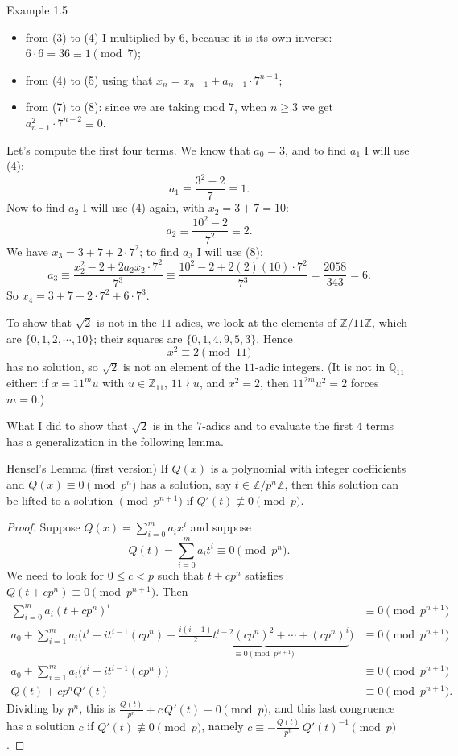 \documentclass[11pt]{article}
\begin{document}
\begin{exbox}{Example 1.5}
\begin{itemize}
\item from (3) to (4) I multiplied by $6$, because it is its own inverse: $6\cdot 6 = 36 \equiv 1 \pmod 7$;
\item from (4) to (5) using that $x_n = x_{n-1} + a_{n-1}\cdot 7^{n-1}$;
\item from (7) to (8): since we are taking mod $7$, when $n \geq 3$ we get $a_{n-1}^2 \cdot 7^{n-2} \equiv 0$.
\end{itemize}
Let's compute the first four terms. We know that $a_0 = 3$, and to find $a_1$ I will use (4):
\[
a_1 \equiv \frac{3^2 - 2}{7} \equiv 1 .
\]
Now to find $a_2$ I will use (4) again, with $x_2 = 3 + 7 = 10$:
\[
a_2 \equiv \frac{10^2 - 2}{7^2} \equiv 2 .
\]
We have $x_3 = 3 + 7 + 2\cdot 7^2$; to find $a_3$ I will use (8):
\[
a_3 \equiv \frac{x_2^2 - 2 + 2a_2 x_2\cdot 7^2}{7^3} \equiv \frac{10^2 - 2 + 2(2)(10)\cdot 7^2}{7^3} = \frac{2058}{343} = 6 .
\]
So $x_4 = 3 + 7 + 2\cdot 7^2 + 6\cdot 7^3$.

To show that $\sqrt{2}$ is not in the $11$-adics, we look at the elements of $\mathbb{Z}/11\mathbb{Z}$, which are $\{0, 1, 2, \cdots, 10\}$; their squares are $\{0, 1, 4, 9, 5, 3\}$. Hence
\[
x^2 \equiv 2 \pmod{11}
\]
has no solution, so $\sqrt{2}$ is not an element of the $11$-adic integers. (It is not in $\mathbb{Q}_{11}$ either: if $x = 11^m u$ with $u \in \mathbb{Z}_{11}$, $11 \nmid u$, and $x^2 = 2$, then $11^{2m}u^2 = 2$ forces $m = 0$.)
\end{exbox}

What I did to show that $\sqrt{2}$ is in the $7$-adics and to evaluate the first $4$ terms has a generalization in the following lemma.

\begin{thmbox}{Hensel's Lemma (first version)}
If $Q(x)$ is a polynomial with integer coefficients and $Q(x) \equiv 0 \pmod{p^n}$ has a solution, say $t \in \mathbb{Z}/p^n\mathbb{Z}$, then this solution can be lifted to a solution $\pmod{p^{n+1}}$ if $Q'(t) \not\equiv 0 \pmod p$.
\end{thmbox}

\begin{proof}
Suppose $Q(x) = \sum_{i=0}^m a_i x^i$ and suppose
\[
Q(t) = \sum_{i=0}^m a_i t^i \equiv 0 \pmod{p^n} .
\]
We need to look for $0 \leq c < p$ such that $t + cp^n$ satisfies $Q(t + cp^n) \equiv 0 \pmod{p^{n+1}}$. Then
\[
\begin{aligned}
\sum_{i=0}^m a_i (t + cp^n)^i &\equiv 0 \pmod{p^{n+1}} \\
a_0 + \sum_{i=1}^m a_i \Big( t^i + i t^{i-1}(cp^n) + \underbrace{\tfrac{i(i-1)}{2} t^{i-2}(cp^n)^2 + \cdots + (cp^n)^i}_{\equiv 0 \pmod{p^{n+1}}} \Big) &\equiv 0 \pmod{p^{n+1}} \\
a_0 + \sum_{i=1}^m a_i \big( t^i + i t^{i-1}(cp^n) \big) &\equiv 0 \pmod{p^{n+1}} \\
Q(t) + cp^n Q'(t) &\equiv 0 \pmod{p^{n+1}} .
\end{aligned}
\]
Dividing by $p^n$, this is $\frac{Q(t)}{p^n} + c\,Q'(t) \equiv 0 \pmod p$, and this last congruence has a solution $c$ if $Q'(t) \not\equiv 0 \pmod p$, namely $c \equiv -\frac{Q(t)}{p^n}\, Q'(t)^{-1} \pmod p$.
\end{proof}
\end{document}
